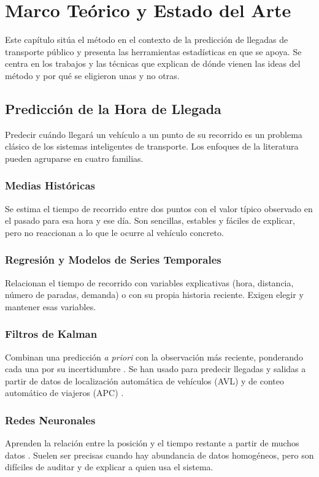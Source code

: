 \chapter{Marco Teórico y Estado del Arte}
\label{cap:marco}

Este capítulo sitúa el método en el contexto de la predicción de llegadas de transporte público y presenta las
herramientas estadísticas en que se apoya. Se centra en los trabajos y las técnicas que explican de dónde vienen las
ideas del método y por qué se eligieron unas y no otras.

\section{Predicción de la Hora de Llegada}

Predecir cuándo llegará un vehículo a un punto de su recorrido es un problema clásico de los sistemas inteligentes de
transporte. Los enfoques de la literatura pueden agruparse en cuatro familias.

\subsection{Medias Históricas} Se estima el tiempo de recorrido entre dos puntos con el valor típico observado en el
pasado para esa hora y ese día. Son sencillas, estables y fáciles de explicar, pero no reaccionan a lo que le ocurre
al vehículo concreto.

\subsection{Regresión y Modelos de Series Temporales} Relacionan el tiempo de recorrido con variables explicativas
(hora, distancia, número de paradas, demanda) o con su propia historia reciente. Exigen elegir y mantener esas
variables.

\subsection{Filtros de Kalman} Combinan una predicción \emph{a priori} con la observación más reciente, ponderando cada una
por su incertidumbre \citep{kalman1960}. Se han usado para predecir llegadas y salidas a partir de datos de
localización automática de vehículos (AVL) y de conteo automático de viajeros (APC) \citep{shalaby2004}.

\subsection{Redes Neuronales} Aprenden la relación entre la posición y el tiempo restante a partir de muchos datos
\citep{chien2002,jeong2005}. Suelen ser precisas cuando hay abundancia de datos homogéneos, pero son difíciles de
auditar y de explicar a quien usa el sistema.

